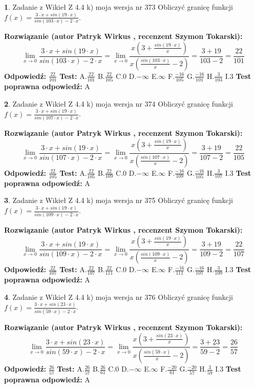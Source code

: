 \documentclass[12pt, a4paper]{article}
\theoremstyle{definition} %
\newtheorem{zad}{}
\newcommand{\zadStart}[1]{\begin{zad}#1\newline}
\newcommand{\zadStop}{\end{zad}}
\newcommand{\rozwStart}[2]{\noindent \textbf{Rozwiązanie (autor #1 , recenzent #2): }\newline}
\newcommand{\rozwStop}{\newline}
\newcommand{\odpStart}{\noindent \textbf{Odpowiedź:}\newline}
\newcommand{\odpStop}{\newline}
\newcommand{\testStart}{\noindent \textbf{Test:}\newline}
\newcommand{\testStop}{\newline}
\newcommand{\kluczStart}{\noindent \textbf{Test poprawna odpowiedź:}\newline}
\newcommand{\kluczStop}{\newline}
\begin{document}
\zadStart{Zadanie z Wikieł Z 4.4 k) moja wersja nr 373}
Obliczyć granicę funkcji $f(x)=\frac{3\cdot x +sin(19\cdot x)}{sin(103\cdot x) -2\cdot x}$.
\zadStop
\rozwStart{Patryk Wirkus}{Szymon Tokarski}
$$\lim\limits_{x\to 0}\frac{3\cdot x +sin(19\cdot x)}{sin(103\cdot x) -2\cdot x}
=\lim\limits_{x\to 0}\frac{x(3+\frac{sin(19\cdot x)}{x})}{x(\frac{sin(103\cdot x)}{x}-2)}
=\frac{3+19}{103-2} = \frac{22}{101}$$
\rozwStop
\odpStart
$\frac{22}{101}$
\odpStop
\testStart
A.$\frac{22}{101}$
B.$\frac{22}{105}$
C.$0$
D.$-\infty$
E.$\infty$
F.$\frac{-16}{105}$
G.$\frac{-16}{101}$
H.$\frac{3}{103}$
I.$3$
\testStop
\kluczStart
A
\kluczStop



\zadStart{Zadanie z Wikieł Z 4.4 k) moja wersja nr 374}
Obliczyć granicę funkcji $f(x)=\frac{3\cdot x +sin(19\cdot x)}{sin(107\cdot x) -2\cdot x}$.
\zadStop
\rozwStart{Patryk Wirkus}{Szymon Tokarski}
$$\lim\limits_{x\to 0}\frac{3\cdot x +sin(19\cdot x)}{sin(107\cdot x) -2\cdot x}
=\lim\limits_{x\to 0}\frac{x(3+\frac{sin(19\cdot x)}{x})}{x(\frac{sin(107\cdot x)}{x}-2)}
=\frac{3+19}{107-2} = \frac{22}{105}$$
\rozwStop
\odpStart
$\frac{22}{105}$
\odpStop
\testStart
A.$\frac{22}{105}$
B.$\frac{22}{109}$
C.$0$
D.$-\infty$
E.$\infty$
F.$\frac{-16}{109}$
G.$\frac{-16}{105}$
H.$\frac{3}{107}$
I.$3$
\testStop
\kluczStart
A
\kluczStop



\zadStart{Zadanie z Wikieł Z 4.4 k) moja wersja nr 375}
Obliczyć granicę funkcji $f(x)=\frac{3\cdot x +sin(19\cdot x)}{sin(109\cdot x) -2\cdot x}$.
\zadStop
\rozwStart{Patryk Wirkus}{Szymon Tokarski}
$$\lim\limits_{x\to 0}\frac{3\cdot x +sin(19\cdot x)}{sin(109\cdot x) -2\cdot x}
=\lim\limits_{x\to 0}\frac{x(3+\frac{sin(19\cdot x)}{x})}{x(\frac{sin(109\cdot x)}{x}-2)}
=\frac{3+19}{109-2} = \frac{22}{107}$$
\rozwStop
\odpStart
$\frac{22}{107}$
\odpStop
\testStart
A.$\frac{22}{107}$
B.$\frac{22}{111}$
C.$0$
D.$-\infty$
E.$\infty$
F.$\frac{-16}{111}$
G.$\frac{-16}{107}$
H.$\frac{3}{109}$
I.$3$
\testStop
\kluczStart
A
\kluczStop



\zadStart{Zadanie z Wikieł Z 4.4 k) moja wersja nr 376}
Obliczyć granicę funkcji $f(x)=\frac{3\cdot x +sin(23\cdot x)}{sin(59\cdot x) -2\cdot x}$.
\zadStop
\rozwStart{Patryk Wirkus}{Szymon Tokarski}
$$\lim\limits_{x\to 0}\frac{3\cdot x +sin(23\cdot x)}{sin(59\cdot x) -2\cdot x}
=\lim\limits_{x\to 0}\frac{x(3+\frac{sin(23\cdot x)}{x})}{x(\frac{sin(59\cdot x)}{x}-2)}
=\frac{3+23}{59-2} = \frac{26}{57}$$
\rozwStop
\odpStart
$\frac{26}{57}$
\odpStop
\testStart
A.$\frac{26}{57}$
B.$\frac{26}{61}$
C.$0$
D.$-\infty$
E.$\infty$
F.$\frac{-20}{61}$
G.$\frac{-20}{57}$
H.$\frac{3}{59}$
I.$3$
\testStop
\kluczStart
A
\kluczStop
\end{document}
